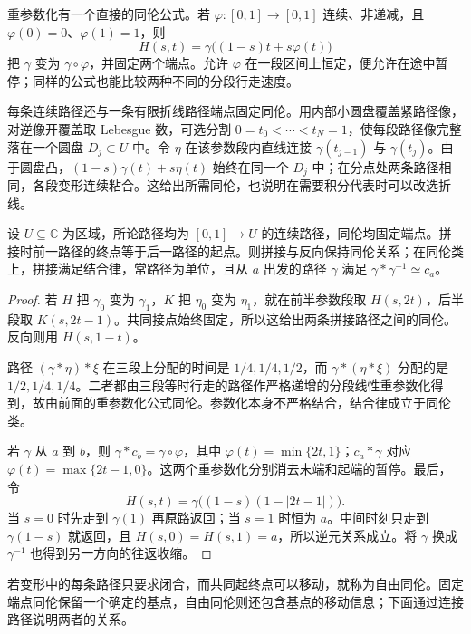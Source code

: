 \ProseParagraphBreak
重参数化有一个直接的同伦公式。若 \(\varphi:[0,1]\to[0,1]\) 连续、非递减，且 \(\varphi(0)=0\)、\(\varphi(1)=1\)，则
\[
 H(s,t)=\gamma\bigl((1-s)t+s\varphi(t)\bigr)
\]
把 \(\gamma\) 变为 \(\gamma\circ\varphi\)，并固定两个端点。允许 \(\varphi\) 在一段区间上恒定，便允许在途中暂停；同样的公式也能比较两种不同的分段行走速度。

\ProseParagraphBreak
每条连续路径还与一条有限折线路径端点固定同伦。用内部小圆盘覆盖紧路径像，对逆像开覆盖取 Lebesgue 数，可选分割 \(0=t_0<\cdots<t_N=1\)，使每段路径像完整落在一个圆盘 \(D_j\subset U\) 中。令 \(\eta\) 在该参数段内直线连接 \(\gamma(t_{j-1})\) 与 \(\gamma(t_j)\)。由于圆盘凸，\((1-s)\gamma(t)+s\eta(t)\) 始终在同一个 \(D_j\) 中；在分点处两条路径相同，各段变形连续粘合。这给出所需同伦，也说明在需要积分代表时可以改选折线。

\begin{proposition}\label{b3:prop:09-path-homotopies}
设 \(U\subseteq\mathbb C\) 为区域，所论路径均为 \([0,1]\to U\) 的连续路径，同伦均固定端点。拼接时前一路径的终点等于后一路径的起点。则拼接与反向保持同伦关系；在同伦类上，拼接满足结合律，常路径为单位，且从 \(a\) 出发的路径 \(\gamma\) 满足 \(\gamma*\gamma^{-1}\simeq c_a\)。
\end{proposition}
\begin{proof}
若 \(H\) 把 \(\gamma_0\) 变为 \(\gamma_1\)，\(K\) 把 \(\eta_0\) 变为 \(\eta_1\)，就在前半参数段取 \(H(s,2t)\)，后半段取 \(K(s,2t-1)\)。共同接点始终固定，所以这给出两条拼接路径之间的同伦。反向则用 \(H(s,1-t)\)。

路径 \((\gamma*\eta)*\xi\) 在三段上分配的时间是 \(1/4,1/4,1/2\)，而 \(\gamma*(\eta*\xi)\) 分配的是 \(1/2,1/4,1/4\)。二者都由三段等时行走的路径作严格递增的分段线性重参数化得到，故由前面的重参数化公式同伦。参数化本身不严格结合，结合律成立于同伦类。

若 \(\gamma\) 从 \(a\) 到 \(b\)，则 \(\gamma*c_b=\gamma\circ\varphi\)，其中 \(\varphi(t)=\min\{2t,1\}\)；\(c_a*\gamma\) 对应 \(\varphi(t)=\max\{2t-1,0\}\)。这两个重参数化分别消去末端和起端的暂停。最后，令
\[
 H(s,t)=\gamma\bigl((1-s)(1-|2t-1|)\bigr).
\]
当 \(s=0\) 时先走到 \(\gamma(1)\) 再原路返回；当 \(s=1\) 时恒为 \(a\)。中间时刻只走到 \(\gamma(1-s)\) 就返回，且 \(H(s,0)=H(s,1)=a\)，所以逆元关系成立。将 \(\gamma\) 换成 \(\gamma^{-1}\) 也得到另一方向的往返收缩。
\end{proof}
若变形中的每条路径只要求闭合，而共同起终点可以移动，就称为自由同伦。固定端点同伦保留一个确定的基点，自由同伦则还包含基点的移动信息；下面通过连接路径说明两者的关系。

